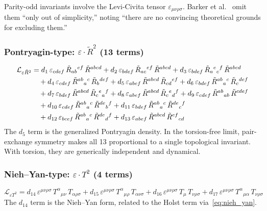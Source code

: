 \documentclass[12pt,a4paper]{article}
\newcommand{\Rt}{\tilde{R}}         %
\newcommand{\eps}{\varepsilon}       %
\begin{document}
Parity-odd invariants involve the Levi-Civita tensor
$\eps_{\mu\nu\rho\sigma}$. Barker et al.~\cite{Barker:2024ydb}
omit them ``only out of simplicity,'' noting ``there are no
convincing theoretical grounds for excluding them.''

\subsubsection{Pontryagin-type: $\eps \cdot \Rt^2$ (13 terms)}

\begin{align}
  \mathcal{L}_{\eps\Rt^2} &=
    d_1\, \eps_{cdef}\,\Rt_{ab}{}^{ef}\,\Rt^{abcd}
  + d_2\, \eps_{bdef}\,\Rt_{ac}{}^{ef}\,\Rt^{abcd}
  + d_3\, \eps_{bdef}\,\Rt_{a}{}^{e}{}_{c}{}^{f}\,\Rt^{abcd}
  \notag\\&\quad
  + d_4\, \eps_{cdef}\,\Rt^{ab}{}_{a}{}^{c}\,\Rt_{b}{}^{def}
  + d_5\, \eps_{abef}\,\Rt^{abcd}\,\Rt_{cd}{}^{ef}
  + d_6\, \eps_{bdef}\,\Rt^{ab}{}_{a}{}^{c}\,\Rt_{c}{}^{def}
  \notag\\&\quad
  + d_7\, \eps_{bdef}\,\Rt^{abcd}\,\Rt_{c}{}^{e}{}_{a}{}^{f}
  + d_8\, \eps_{abef}\,\Rt^{abcd}\,\Rt_{c}{}^{e}{}_{d}{}^{f}
  + d_9\, \eps_{cdef}\,\Rt^{ab}{}_{ab}\,\Rt^{cdef}
  \notag\\&\quad
  + d_{10}\, \eps_{cdef}\,\Rt^{ab}{}_{a}{}^{c}\,\Rt^{de}{}_{b}{}^{f}
  + d_{11}\, \eps_{bdef}\,\Rt^{ab}{}_{a}{}^{c}\,\Rt^{de}{}_{c}{}^{f}
  \notag\\&\quad
  + d_{12}\, \eps_{bcef}\,\Rt^{ab}{}_{a}{}^{c}\,\Rt^{de}{}_{d}{}^{f}
  + d_{13}\, \eps_{abef}\,\Rt^{abcd}\,\Rt^{ef}{}_{cd}
  \label{eq:eps_curv_squared}
\end{align}
The $d_5$ term is the generalized Pontryagin density. In the
torsion-free limit, pair-exchange symmetry makes all 13 proportional
to a single topological invariant. With torsion, they are generically
independent and dynamical.

\subsubsection{Nieh--Yan-type: $\eps \cdot T^2$ (4 terms)}

\begin{equation}
\boxed{
  \mathcal{L}_{\eps T^2}
  = d_{14}\, \eps^{\mu\nu\rho\sigma}\, T^\alpha{}_{\mu\nu}\, T_{\alpha\rho\sigma}
  + d_{15}\, \eps^{\mu\nu\rho\sigma}\, T^\alpha{}_{\mu\rho}\, T_{\alpha\nu\sigma}
  + d_{16}\, \eps^{\mu\nu\rho\sigma}\, T_\mu\, T_{\nu\rho\sigma}
  + d_{17}\, \eps^{\mu\nu\rho\sigma}\, T^\alpha{}_{\mu\alpha}\, T_{\nu\rho\sigma}
}
  \label{eq:eps_torsion_squared}
\end{equation}
The $d_{14}$ term is the Nieh--Yan form, related to the Holst
term via~\eqref{eq:nieh_yan}.
\end{document}
